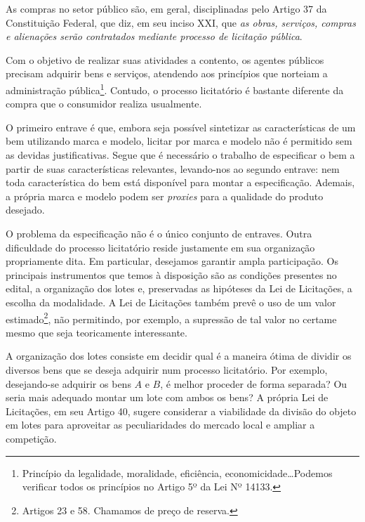 \label{cap:introducao}

\enlargethispage{.5\baselineskip}

As compras no setor público são, em geral, disciplinadas pelo Artigo 37 da Constituição Federal, que diz, em seu inciso XXI, que \emph{as obras, serviços, compras e alienações serão contratados mediante processo de licitação pública}.

Com o objetivo de realizar suas atividades a contento, os agentes públicos precisam adquirir bens e serviços, atendendo aos princípios que norteiam a administração pública\footnote{Princípio da legalidade, moralidade, eficiência, economicidade\ldots Podemos verificar todos os princípios no Artigo 5º da Lei Nº 14133.}. Contudo, o processo licitatório é bastante diferente da compra que o consumidor realiza usualmente.

O primeiro entrave é que, embora seja possível sintetizar as características de um bem utilizando marca e modelo, licitar por marca e modelo não é permitido sem as devidas justificativas. Segue que é necessário o trabalho de especificar o bem a partir de suas características relevantes, levando-nos ao segundo entrave: nem toda característica do bem está disponível para montar a especificação. Ademais, a própria marca e modelo podem ser \emph{proxies} para a qualidade do produto desejado.

O problema da especificação não é o único conjunto de entraves. Outra dificuldade do processo licitatório reside justamente em sua organização propriamente dita. Em particular, desejamos garantir ampla participação. Os principais instrumentos que temos à disposição são as condições presentes no edital, a organização dos lotes e, preservadas as hipóteses da Lei de Licitações, a escolha da modalidade. A Lei de Licitações também prevê o uso de um valor estimado\footnote{Artigos 23 e 58. Chamamos de preço de reserva.}, não permitindo, por exemplo, a supressão de tal valor no certame mesmo que seja teoricamente interessante.

A organização dos lotes consiste em decidir qual é a maneira ótima de dividir os diversos bens que se deseja adquirir num processo licitatório. Por exemplo, desejando-se adquirir os bens $A$ e $B$, é melhor proceder de forma separada? Ou seria mais adequado montar um lote com ambos os bens? A própria Lei de Licitações, em seu Artigo 40, sugere considerar a viabilidade da divisão do objeto em lotes para aproveitar as peculiaridades do mercado local e ampliar a competição.

